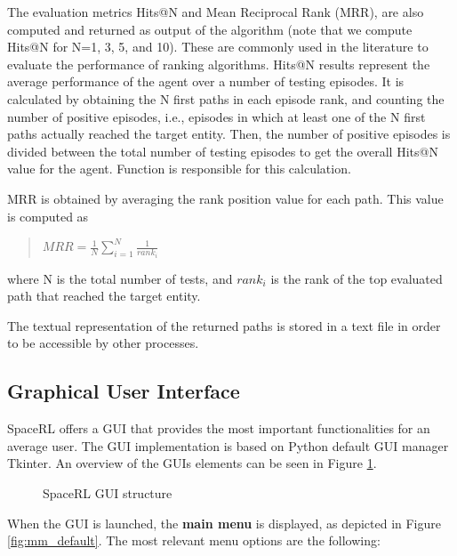 The evaluation metrics Hits@N and Mean Reciprocal Rank (MRR), are also computed and returned as output of the algorithm (note that we compute Hits@N for N=1, 3, 5, and 10). These are commonly used in the literature to evaluate the performance of ranking algorithms. 
Hits@N results represent the average performance of
the agent over a number of testing episodes. It is calculated by obtaining the 
N first paths in each episode rank, and counting the number of positive episodes, i.e., episodes in which at least one of the N first paths actually reached the target entity. Then, the number of positive episodes is divided between the total number of testing episodes to get the overall Hits@N value for the agent. Function  is responsible for this calculation.

MRR is obtained by averaging the rank position value for each path. This value is computed as

\begin{quote}
 \centering
    $ MRR = \frac{1}{N} \sum_{i=1}^{N} \frac{1}{rank_i}$
\end{quote}

where N is the total number of tests, and $rank_i$ is the rank of the top evaluated path that reached the target entity.

The textual representation of the returned paths is stored in a text file in order to be accessible by other processes. 

\subsection{Graphical User Interface} \label{sec:framework-GUI}

SpaceRL offers a GUI that provides the most important functionalities for an average user. The GUI implementation is based on Python default GUI manager Tkinter. An overview of the GUIs elements can be seen in Figure \ref{fig:GUI_structure}.


\begin{figure}[!h]
    \centering
    
    \caption{SpaceRL GUI structure}
    \label{fig:GUI_structure}
\end{figure}


When the GUI is launched, the \textbf{main menu} is displayed, as depicted in Figure \ref{fig:mm_default}. The most relevant menu options are the following:

